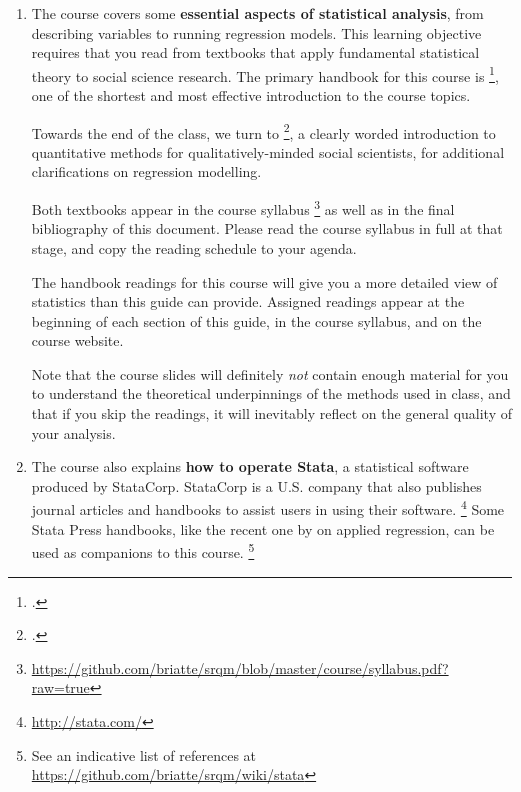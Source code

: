 \begin{enumerate}
  

	\label{sec:textbooks}%
  \item The course covers some \textbf{essential aspects of statistical analysis}, from describing variables to running regression models. %
  	This learning objective requires that you read from textbooks that apply fundamental statistical theory to social science research. The primary handbook for this course is \footcite{Urdan:2010a}, one of the shortest and most effective introduction to the course topics. %
	
		Towards the end of the class, we turn to \footcite{FeinsteinThomas:2002d}, a clearly worded introduction to quantitative methods for qualitatively-minded social scientists, for additional clarifications on regression modelling.%
  
  	Both textbooks appear in the course syllabus%
		\footnote{\url{https://github.com/briatte/srqm/blob/master/course/syllabus.pdf?raw=true}} as well as in the final bibliography of this document. Please read the course syllabus in full at that stage, and copy the reading schedule to your agenda.%
		
    The handbook readings for this course will give you a more detailed view of statistics than this guide can provide. Assigned readings appear at the beginning of each section of this guide, in the course syllabus, and on the course website.%

		Note that the course slides will definitely \emph{not} contain enough material for you to understand the theoretical underpinnings of the methods used in class, and that if you skip the readings, it will inevitably reflect on the general quality of your analysis.%


  \item The course also explains \textbf{how to operate Stata}, a statistical software produced by StataCorp. %
	  StataCorp is a U.S. company that also publishes journal articles and handbooks to assist users in using their software.%
		\footnote{\url{http://stata.com/}} %
		Some Stata Press handbooks, like the recent one by \citeauthor{Mitchell:2012a} on applied regression, can be used as companions to this course.%
		\footnote{See an indicative list of references at %
			\url{https://github.com/briatte/srqm/wiki/stata}} %
		

\end{enumerate}
